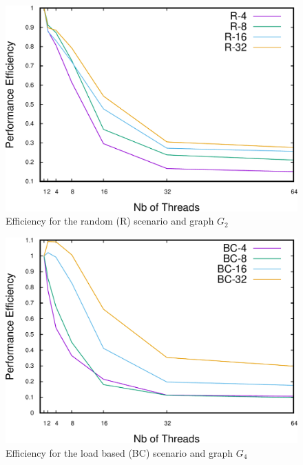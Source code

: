 \begin{figure}
\centering
\includegraphics[scale=0.35]{bench/bench-efficiency/efficiency-r-2-crop.pdf}
\caption{Efficiency for the random (R) scenario and graph $G_2$}
\label{fig:effr2}
\end{figure}

\begin{figure}
\centering
\includegraphics[scale=0.35]{bench/bench-efficiency/efficiency-bc-4-crop.pdf}
\caption{Efficiency for the load based (BC) scenario and graph $G_4$}
\label{fig:effbc4}
\end{figure}

